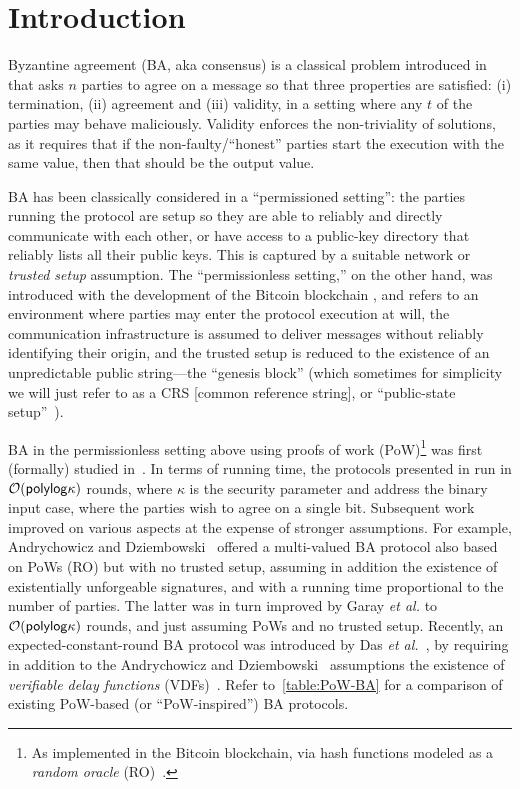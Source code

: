 \section{Introduction}
\label{sec:introduction}

Byzantine agreement (BA, aka consensus) is a classical problem introduced in~\cite{JACM:PeaShoLam80} that asks $n$ parties to agree on a message so that three properties are satisfied: (i) termination, (ii) agreement and (iii) validity, in a setting where any $t$ of the parties may behave maliciously.
%
Validity enforces the non-triviality of solutions, as it requires that if the non-faulty/``honest'' parties start the execution with the same value, then that should be the output value.

BA has been classically considered in a ``permissioned setting'': the parties running the protocol are setup so they are able to reliably and directly communicate with each other, or have access to a public-key directory that reliably lists all their public keys.
%
This is captured by a suitable network or \emph{trusted setup} assumption.
%
The ``permissionless setting,'' on the other hand, was introduced with the development of the Bitcoin blockchain \cite{Nak08}, and refers to an environment where parties may enter the protocol execution at will, the communication infrastructure is assumed to deliver messages without reliably identifying their origin, and the trusted setup is reduced to the existence of an unpredictable public string---the ``genesis block'' (which sometimes for simplicity we will just refer to as a CRS [common reference string], or ``public-state setup''~\cite{RSA:GarKia20}).

BA in the permissionless setting above using proofs of work (PoW)\footnote{As implemented in the Bitcoin  blockchain, via hash functions modeled as a \emph{random oracle} (RO)~\cite{CCS:BelRog93}.} was first (formally) studied in~\cite{EC:GarKiaLeo15}.
%
In terms of running time, the protocols presented in \cite{EC:GarKiaLeo15} run in $\mathcal{O}(\mathsf{polylog} \kappa)$ rounds, where $\kappa$ is the security parameter and address the binary input case, where the parties wish to agree on a single bit.
%
Subsequent work improved on various aspects at the expense of stronger assumptions.
%
For example, Andrychowicz and Dziembowski~\cite{C:AndDzi15} offered a multi-valued BA protocol also based on PoWs (RO) but with no trusted setup, assuming in addition the existence of existentially unforgeable signatures, and with a running time proportional to the number of parties.
%
The latter was in turn improved by Garay \textit{et al.} \cite{PKC:GKLP18} to $\mathcal{O}(\mathsf{polylog} \kappa)$ rounds, and just assuming PoWs and no trusted setup.
%
Recently, an expected-constant-round BA protocol was introduced by Das \textit{et al.}~\cite{EPRINT:DEFLM22}, by requiring in addition to the Andrychowicz and Dziembowski~\cite{C:AndDzi15} assumptions the existence of \emph{verifiable delay functions} (VDFs)~\cite{C:BBBF18}.
%
Refer to~\cref{table:PoW-BA} for a comparison of existing PoW-based (or ``PoW-inspired'') BA protocols.

